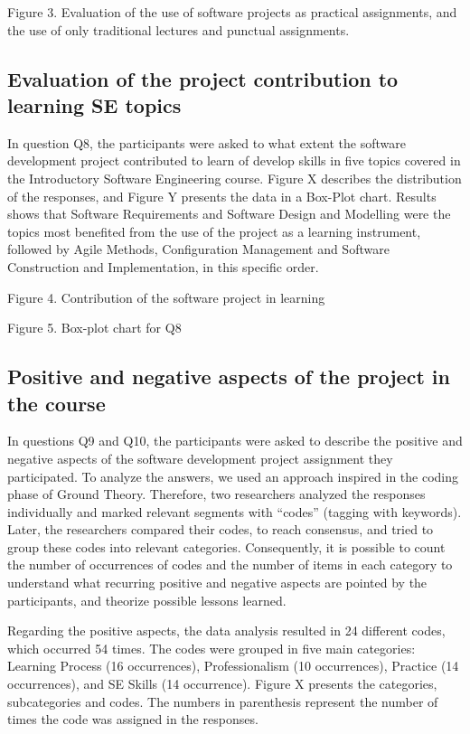 Figure 3. Evaluation of the use of software projects as practical assignments, and the use of only traditional lectures and punctual assignments.

\subsection{Evaluation of the project contribution to learning SE topics}

In question Q8, the participants were asked to what extent the software development project contributed to learn of develop skills in five topics covered in the Introductory Software Engineering course. Figure X describes the distribution of the responses, and Figure Y presents the data in a Box-Plot chart. Results shows that Software Requirements and Software Design and Modelling were the topics most benefited from the use of the project as a learning instrument, followed by Agile Methods, Configuration Management and Software Construction and Implementation, in this specific order.

Figure 4. Contribution of the software project in learning

Figure 5. Box-plot chart for Q8

\subsection{Positive and negative aspects of the project in the course}

In questions Q9 and Q10, the participants were asked to describe the positive and negative aspects of the software development project assignment they participated. To analyze the answers, we used an approach inspired in the coding phase of Ground Theory. Therefore, two researchers analyzed the responses individually and marked relevant segments with “codes” (tagging with keywords). Later, the researchers compared their codes, to reach consensus, and tried to group these codes into relevant categories. Consequently, it is possible to count the number of occurrences of codes and the number of items in each category to understand what recurring positive and negative aspects are pointed by the participants, and theorize possible lessons learned.

Regarding the positive aspects, the data analysis resulted in 24 different codes, which occurred 54 times. The codes were grouped in five main categories: Learning Process (16 occurrences), Professionalism (10 occurrences), Practice (14 occurrences), and SE Skills (14 occurrence). Figure X presents the categories, subcategories and codes. The numbers in parenthesis represent the number of times the code was assigned in the responses.

